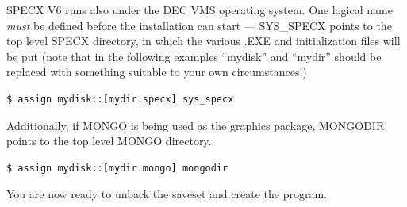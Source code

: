\documentclass[11pt,twoside]{report}
\begin{document}
SPECX V6 runs also under the DEC VMS operating system. One logical
name {\em must} be defined before the
installation can start --- SYS\_SPECX points to
the top level SPECX directory, in which the various .EXE and initialization
files will be put (note that in the following examples ``mydisk'' and ``mydir''
should be replaced with something suitable to your own circumstances!)\\ 
\begin{verbatim}
$ assign mydisk::[mydir.specx] sys_specx
\end{verbatim}

Additionally, if MONGO is being used as the graphics package,
MONGODIR points to the top level MONGO
directory.
\begin{verbatim}
$ assign mydisk::[mydir.mongo] mongodir
\end{verbatim}

You are now ready to unback the saveset and create the program.
\end{document}
